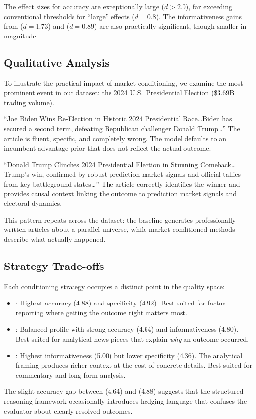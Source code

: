 The effect sizes for accuracy are exceptionally large ($d > 2.0$), far exceeding conventional thresholds for ``large'' effects ($d = 0.8$). The informativeness gains from \superforecaster ($d = 1.73$) and \mcp ($d = 0.89$) are also practically significant, though smaller in magnitude.

\subsection{Qualitative Analysis}
\label{sec:qualitative}

To illustrate the practical impact of market conditioning, we examine the most prominent event in our dataset: the 2024 U.S.\ Presidential Election (\$3.69B trading volume).

 ``Joe Biden Wins Re-Election in Historic 2024 Presidential Race\ldots Biden has secured a second term, defeating Republican challenger Donald Trump\ldots'' The article is fluent, specific, and completely wrong. The model defaults to an incumbent advantage prior that does not reflect the actual outcome.

 ``Donald Trump Clinches 2024 Presidential Election in Stunning Comeback\ldots Trump's win, confirmed by robust prediction market signals and official tallies from key battleground states\ldots'' The article correctly identifies the winner and provides causal context linking the outcome to prediction market signals and electoral dynamics.

This pattern repeats across the dataset: the baseline generates professionally written articles about a parallel universe, while market-conditioned methods describe what actually happened.

\subsection{Strategy Trade-offs}
\label{sec:tradeoffs}

Each conditioning strategy occupies a distinct point in the quality space:

\begin{itemize}[leftmargin=*,itemsep=0pt,topsep=0pt]
    \item \textbf{\directmarket}: Highest accuracy (4.88) and specificity (4.92). Best suited for factual reporting where getting the outcome right matters most.
    \item \textbf{\mcp}: Balanced profile with strong accuracy (4.64) and informativeness (4.80). Best suited for analytical news pieces that explain \emph{why} an outcome occurred.
    \item \textbf{\superforecaster}: Highest informativeness (5.00) but lower specificity (4.36). The analytical framing produces richer context at the cost of concrete details. Best suited for commentary and long-form analysis.
\end{itemize}

The slight accuracy gap between \mcp (4.64) and \directmarket (4.88) suggests that the structured reasoning framework occasionally introduces hedging language that confuses the evaluator about clearly resolved outcomes.
